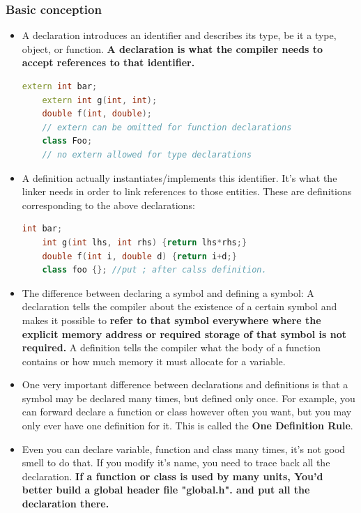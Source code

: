 \documentclass[a4paper,12pt,twoside]{book}
\begin{document}
\subsubsection{Basic conception}
\begin{itemize}
	\item A declaration introduces an identifier and describes its type, be it a type, object, or function. \textbf{A declaration is what the compiler needs to accept references to that identifier.} 
	
	\begin{lstlisting}[frame=single, language=c++]
	extern int bar;
	extern int g(int, int);
	double f(int, double); 
	// extern can be omitted for function declarations
	class Foo; 
	// no extern allowed for type declarations
	\end{lstlisting}
	
	\item A definition actually instantiates/implements this identifier. It's what the linker needs in order to link references to those entities. These are definitions corresponding to the above declarations:
	\begin{lstlisting}[frame=single, language=c++]
	int bar;
	int g(int lhs, int rhs) {return lhs*rhs;}
	double f(int i, double d) {return i+d;}
	class foo {}; //put ; after calss definition.
	\end{lstlisting}
	
	\item The difference between declaring a symbol and defining a symbol: A declaration tells the compiler about the existence of a certain symbol and makes it possible to \textbf{refer to that symbol everywhere where the explicit memory address or required storage of that symbol is not required.}  A definition tells the compiler what the body of a function contains or how much memory it must allocate for a variable.
	
	\item One very important difference between declarations and definitions is that a symbol may be declared many times, but defined only once. For example, you can forward declare a function or class however often you want, but you may only ever have one definition for it. This is called the \textbf{One Definition Rule}.
	
	\item Even you can declare variable, function and class many times, it's not good smell to do that.  If you modify it's name, you need to trace back all the declaration. \textbf{If a function or class is used by many units, You'd better build a global header file "global.h". and put all the declaration there.} 
\end{itemize}
\end{document}
